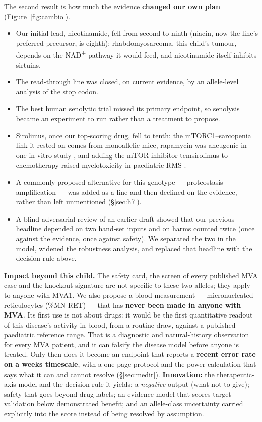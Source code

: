 \documentclass[10pt]{article}
\begin{document}
The second result is how much the evidence \textbf{changed our own plan} (Figure~\ref{fig:cambio}).
\begin{itemize}
\item Our initial lead, nicotinamide, fell from second to ninth (niacin, now the line's preferred precursor, is eighth): rhabdomyosarcoma, this child's tumour,
  depends on the NAD\textsuperscript{+} pathway it would feed, and nicotinamide itself inhibits sirtuins.
\item The read-through line was closed, on current evidence, by an allele-level analysis of the stop codon.
\item The best human senolytic trial missed its primary endpoint, so senolysis became an experiment to run rather
  than a treatment to propose.
\item Sirolimus, once our top-scoring drug, fell to tenth: the mTORC1--sarcopenia link it rested on comes from
  monoallelic mice, rapamycin was aneugenic in one in-vitro study \citep{bonatti}, and adding the mTOR inhibitor
  temsirolimus to chemotherapy raised myelotoxicity in paediatric RMS \citep{gupta}.
\item A commonly proposed alternative for this genotype --- proteostasis amplification ---
  was added as a line and then declined on the evidence, rather than left unmentioned (§\ref{sec:h7}).
\item A blind adversarial review of an earlier draft showed that our previous headline depended on two hand-set
  inputs and on harms counted twice (once against the evidence, once against safety). We separated the two in the
  model, widened the robustness analysis, and replaced that headline with the decision rule above.
\end{itemize}

\textbf{Impact beyond this child.} The safety card, the screen of every published MVA case and the knockout
signature are not specific to these two alleles; they apply to anyone with MVA1. We also propose a blood
measurement --- micronucleated reticulocytes (\%MN-RET) --- that has \textbf{never been made in anyone with MVA}. Its
first use is not about drugs: it would be the first quantitative readout of this disease's activity in blood, from
a routine draw, against a published paediatric reference range. That is a diagnostic and natural-history
observation for every MVA patient, and it can falsify the disease model before anyone is treated. Only then does it
become an endpoint that reports a \textbf{recent error rate on a weeks timescale}, with a one-page protocol and the
power calculation that says what it can and cannot resolve (§\ref{sec:medir}). \textbf{Innovation:} the therapeutic-axis model and the decision rule it yields; a
\textit{negative} output (what not to give); safety that goes beyond drug labels; an evidence model that scores
target validation below demonstrated benefit; and an allele-class uncertainty carried explicitly into the score
instead of being resolved by assumption.
\end{document}
